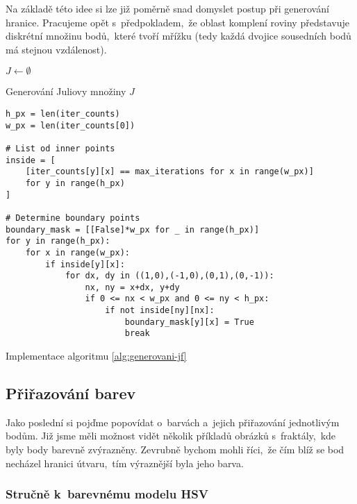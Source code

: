 Na základě této idee si lze již poměrně snad domyslet postup při generování hranice. Pracujeme opět s~předpokladem,~že oblast komplení roviny představuje diskrétní množinu bodů,~které tvoří mřížku (tedy každá dvojice sousedních bodů má stejnou vzdálenost). 
\begin{algorithm}[h]
    $J\gets\emptyset$\;
    \;
    \caption{Generování Juliovy množiny $J$}
    \label{alg:generovani-jf}
\end{algorithm}
\begin{program}
\begin{lstlisting}[style=python]
h_px = len(iter_counts)
w_px = len(iter_counts[0])

# List od inner points
inside = [
    [iter_counts[y][x] == max_iterations for x in range(w_px)]
    for y in range(h_px)
]

# Determine boundary points
boundary_mask = [[False]*w_px for _ in range(h_px)]
for y in range(h_px):
    for x in range(w_px):
        if inside[y][x]:
            for dx, dy in ((1,0),(-1,0),(0,1),(0,-1)):
                nx, ny = x+dx, y+dy
                if 0 <= nx < w_px and 0 <= ny < h_px:
                    if not inside[ny][nx]:
                        boundary_mask[y][x] = True
                        break
\end{lstlisting}
    \caption{Implementace algoritmu \ref{alg:generovani-jf}}
    \label{prog:generovani-jf}
\end{program}

\subsection{Přiřazování barev}\label{subsec:prirazovani-barev}

Jako poslední si pojďme popovídat o~barvách a~jejich přiřazování jednotlivým bodům. Již jsme měli možnost vidět několik příkladů obrázků s~fraktály,~kde byly body barevně zvýrazněny. Zevrubně bychom mohli říci,~že čím blíž se bod necházel hranici útvaru,~tím výraznější byla jeho barva.

\subsubsection{Stručně k~barevnému modelu HSV}

